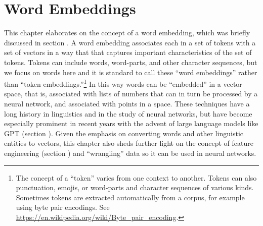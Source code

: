 \chapter{Word Embeddings}\label{ch_word_embeddings}



This chapter elaborates on the concept of a word embedding, which was briefly discussed in section . A word embedding associates each  in a set of tokens with a set of vectors in a way that that captures important characteristics of the set of tokens. Tokens can include words, word-parts, and other character sequences, but we focus on words here and it is standard to call these ``word embeddings'' rather than ``token embeddings.''\footnote{The concept of a ``token'' varies from one context to another. Tokens can also punctuation, emojis, or word-parts and character sequences of various kinds. Sometimes tokens are extracted automatically from a corpus, for example using byte pair encodings.  See \url{https://en.wikipedia.org/wiki/Byte_pair_encoding}.} In this way words can be ``embedded'' in a vector space, that is, associated with lists of numbers that can in turn be processed by a neural network, and associated with points in a space. These techniques have a long history in linguistics and in the study of neural networks, but have become especially prominent in recent years with the advent of large language models like GPT (section ). Given the emphasis on converting words and other linguistic entities to vectors, this chapter also sheds further light on the concept of feature engineering (section ) and ``wrangling'' data so it can be used in neural networks.

